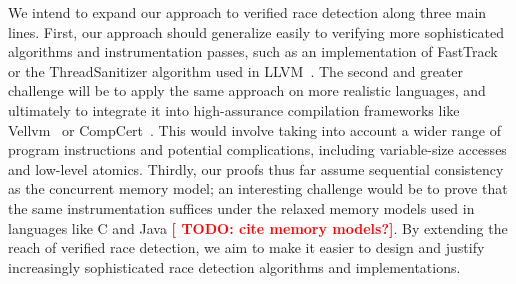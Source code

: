 \documentclass[preprint, 10pt]{sigplanconf}
\newcommand{\TODO}[1]{\textbf{\textcolor{red}{[ TODO: #1]}}}
\begin{document}
We intend to expand our approach to verified race detection along three main lines. First, our approach should generalize easily to verifying more sophisticated algorithms and instrumentation passes, such as an implementation of FastTrack~\cite{fasttrack} or the ThreadSanitizer algorithm used in LLVM~\cite{tsan}. The second and greater challenge will be to apply the same approach on more realistic languages, and ultimately to integrate it into high-assurance compilation frameworks like Vellvm~\cite{vellvm} or CompCert~\cite{compcert}. This would involve taking into account a wider range of program instructions and potential complications, including variable-size accesses and low-level atomics. Thirdly, our proofs thus far assume sequential consistency as the concurrent memory model; an interesting challenge would be to prove that the same instrumentation suffices under the relaxed memory models used in languages like C and Java \TODO{cite memory models?}. By extending the reach of verified race detection, we aim to make it easier to design and justify increasingly sophisticated race detection algorithms and implementations.





\end{document}
